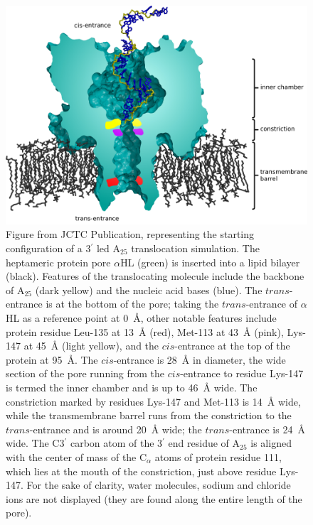 \documentclass[a4paper,10pt]{article}
\newcommand{\atf}{A$_{25}$ }
\newcommand{\ahl}{$\alpha$HL }
\newcommand{\prim}{$^{\prime}$ }
\begin{document}
\begin{figure}[!h]
  \begin{center}
    \includegraphics[width=5.0in]{ahl_labelled13}
  \end{center}
  \caption{Figure from JCTC Publication, representing the starting configuration of a 3\prim led \atf translocation simulation. The heptameric protein pore \ahl (green) is inserted into a lipid bilayer (black). Features of the translocating molecule include the backbone of \atf (dark yellow) and the nucleic acid bases (blue). The $trans$-entrance is at the bottom of the pore; taking the $trans$-entrance of \ahl as a reference point at 0~{\AA}, other notable features include protein residue Leu-135 at 13~{\AA} (red), Met-113 at 43~{\AA} (pink), Lys-147 at 45~{\AA} (light yellow), and the $cis$-entrance at the top of the protein at 95~{\AA}. The $cis$-entrance is 28~{\AA} in diameter, the wide section of the pore running from the $cis$-entrance to residue Lys-147 is termed the inner chamber and is up to 46~{\AA} wide. The constriction marked by residues Lys-147 and Met-113 is 14~{\AA} wide, while the transmembrane barrel runs from the constriction to the $trans$-entrance and is around 20~{\AA} wide; the $trans$-entrance is 24~{\AA} wide. The C3\prim carbon atom of the 3\prim end residue of \atf is aligned with the center of mass of the C$_{\alpha}$ atoms of protein residue 111, which lies at the mouth of the constriction, just above residue Lys-147. For the sake of clarity, water molecules, sodium and chloride ions are not displayed (they are found along the entire length of the pore).}
  \label{fig:edge}
\end{figure} 
\end{document}
